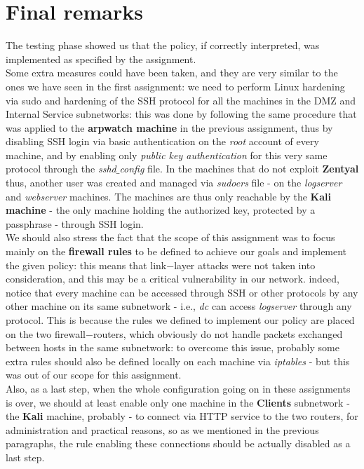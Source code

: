 \section{Final remarks}
The testing phase showed us that the policy, if correctly interpreted, was implemented as specified by the assignment.\\
Some extra measures could have been taken, and they are very similar to the ones we have seen in the first assignment: we need to perform Linux hardening via sudo and hardening of the SSH protocol for all the machines in the DMZ and Internal Service subnetworks: this was done by following the same procedure that was applied to the \textbf{arpwatch machine} in the previous assignment, thus by disabling SSH login via basic authentication on the \textit{root} account of every machine, and by enabling only \textit{public key authentication} for this very same protocol through the \textit{sshd$\_$config} file. In the machines that do not exploit \textbf{Zentyal} thus, another user was created and managed via \textit{sudoers} file - on the \textit{logserver} and \textit{webserver} machines. The machines are thus only reachable by the \textbf{Kali machine} - the only machine holding the authorized key, protected by a passphrase - through SSH login.\\
We should also stress the fact that the scope of this assignment was to focus mainly on the \textbf{firewall rules} to be defined to achieve our goals and implement the given policy: this means that link$-$layer attacks were not taken into consideration, and this may be a critical vulnerability in our network. indeed, notice that every machine can be accessed through SSH or other protocols by any other machine on its same subnetwork - i.e., \textit{dc} can access \textit{logserver} through any protocol. This is because the rules we defined to implement our policy are placed on the two firewall$-$routers, which obviously do not handle packets exchanged between hosts in the same subnetwork: to overcome this issue, probably some extra rules should also be defined locally on each machine via \textit{iptables} - but this was out of our scope for this assignment.\\
Also, as a last step, when the whole configuration going on in these assignments is over, we should at least enable only one machine in the \textbf{Clients} subnetwork - the \textbf{Kali} machine, probably - to connect via HTTP service to the two routers, for administration and practical reasons, so as we mentioned in the previous paragraphs, the rule enabling these connections should be actually disabled as a last step.
